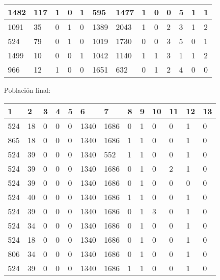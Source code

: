 \begin{table}[H]
\begin{tabular}{|l|l|l|l|l|l|l|l|l|l|l|l|l|}
1482  &  117  &  1  &  0  &  1  &  595  &  1477  &  1  &  0  &  0  &  {\color[HTML]{FE0000}5}  &  1  &  1 \\ \hline
1091  &  35  &  0  &  1  &  0  &  1389  &  2043  &  1  &  0  &  2  &  3  &  1  &  2 \\ \hline
524  &  79  &  0  &  1  &  0  &  1019  &  1730  &  0  &  0  &  3  &  {\color[HTML]{FE0000}5}  &  0  &  1 \\ \hline
1499  &  10  &  0  &  0  &  1  &  1042  &  1140  &  1  &  1  &  3  &  1  &  1  &  2 \\ \hline
966  &  12  &  1  &  0  &  0  &  1651  &  632  &  0  &  1  &  2  &  {\color[HTML]{FE0000}4}  &  0  &  0 \\ \hline
\end{tabular}
\end{table}
Población final:
\begin{table}[H]
\begin{tabular}{|l|l|l|l|l|l|l|l|l|l|l|l|l|}
\hline
\textbf{1} & \textbf{2} & \textbf{3} & \textbf{4} & \textbf{5} & \textbf{6} & \textbf{7} & \textbf{8} & \textbf{9} & \textbf{10} & \textbf{11} & \textbf{12} & \textbf{13} \\ \hline
524  &  18  &  0  &  0  &  0  &  1340  &  1686  &  0  &  1  &  0  &  0  &  1  &  0 \\ \hline
865  &  18  &  0  &  0  &  0  &  1340  &  1686  &  1  &  1  &  0  &  0  &  1  &  0 \\ \hline
524  &  39  &  0  &  0  &  0  &  1340  &  552  &  1  &  1  &  0  &  0  &  1  &  0 \\ \hline
524  &  39  &  0  &  0  &  0  &  1340  &  1686  &  0  &  1  &  0  &  2  &  1  &  0 \\ \hline
524  &  39  &  0  &  0  &  0  &  1340  &  1686  &  0  &  1  &  0  &  0  &  0  &  0 \\ \hline
524  &  40  &  0  &  0  &  0  &  1340  &  1686  &  1  &  1  &  0  &  0  &  1  &  0 \\ \hline
524  &  39  &  0  &  0  &  0  &  1340  &  1686  &  0  &  1  &  3  &  0  &  1  &  0 \\ \hline
524  &  34  &  0  &  0  &  0  &  1340  &  1686  &  0  &  1  &  0  &  0  &  1  &  0 \\ \hline
524  &  18  &  0  &  0  &  0  &  1340  &  1686  &  0  &  1  &  0  &  0  &  1  &  0 \\ \hline
806  &  34  &  0  &  0  &  0  &  1340  &  1686  &  0  &  1  &  0  &  0  &  1  &  0 \\ \hline
524  &  39  &  0  &  0  &  0  &  1340  &  1686  &  1  &  1  &  0  &  0  &  1  &  0 \\ \hline

\end{tabular}
\end{table}
